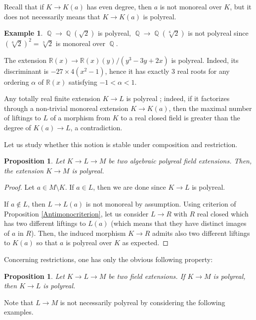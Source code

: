 \documentclass[12pt]{amsart}
\newtheorem{prop}[thm]{Proposition}
\theoremstyle{definition}
\newtheorem{ex}[thm]{Example}
\DeclareMathOperator{\QQ}{\mathbb Q}
\def \RR {{\mathbb R}}
\begin{document}
Recall that if $K\to K(a)$ has even degree, then $a$ is not monoreal over $K$, but it does not necessarily means that 
$K\to K(a)$ is polyreal.


\begin{ex}\label{Ext3}
$\QQ\to \QQ(\sqrt{2})$ is polyreal,
$\QQ\to \QQ(\sqrt[6]{2})$ is not polyreal since 
$(\sqrt[6]{2})^2=\sqrt[3]{2}$ is monoreal over $\QQ$. 

The extension $\RR(x)\to \RR(x)(y)/(y^3-3y+2x)$ is polyreal.
Indeed, its discriminant is $-27\times 4(x^2-1)$, hence it has exactly 3 real roots for any ordering $\alpha$ of $\RR(x)$ satisfying $-1<\alpha<1$.

Any totally real finite extension $K \to L$ is polyreal ; indeed, if it factorizes through a non-trivial monoreal extension $K\to K(a)$, then the maximal number of liftings to $L$ of a morphism from $K$ to a real closed field is greater than the degree of $K(a)\to L$, a contradiction.
\end{ex}

Let us study whether this notion is stable under composition and restriction.


\begin{prop}\label{polyrealComposition}
	Let $K\to L\to M$ be two algebraic polyreal field extensions.
	Then, the extension $K\to M$ is polyreal.
\end{prop}	
\begin{proof}
	Let $a\in M\setminus K$.
	If $a\in L$, then we are done since $K\to L$ is polyreal.
	
	If $a\notin L$, then $L\to L(a)$ is not monoreal by assumption. Using criterion of Proposition \ref{Antimonocriterion}, let us consider $L\to R$ with $R$ real closed which has two different liftings to $L(a)$ (which means that they have distinct images of $a$ in $R$). Then, the induced morphism $K\to R$ admits also two different liftings to $K(a)$ so that $a$ is polyreal over $K$ as expected.
\end{proof}

Concerning restrictions, one has only the obvious following property:

\begin{prop}\label{polyrealRestriction}
	Let $K\to L\to M$ be two field extensions.
	If $K\to M$ is polyreal, then $K\to L$ is polyreal.
\end{prop}	


Note that $L\to M$ is not necessarily polyreal by considering the following examples.
\end{document}

